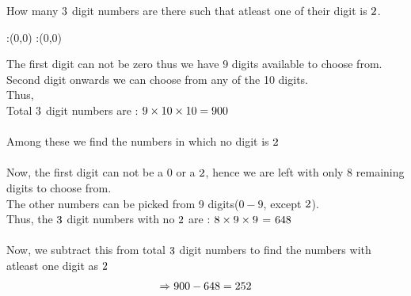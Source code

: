 



\question[3] How many $3$ digit numbers are there such that atleast one of their digit is $2$. 


\watchout

\ifprintanswers
  \begin{marginfigure}
      :(0,0)
      :(0,0)
    \figdrawbegin{}
      \figdrawline [100,101]
    \figdrawend
    \figvisu{\figBoxA}{}{%
    }
    \centerline{\box\figBoxA}
  \end{marginfigure}
\fi 

\begin{solution}[\halfpage]
The first digit can not be zero thus we have 9 digits available to choose from. Second digit onwards we can choose from any of the 10 digits.\\
Thus,\\
Total ${3}$ digit numbers are : ${9 \times 10 \times 10} = {900}$\\ \\
Among these we find the numbers in which no digit is $2$\\ \\
Now, the first digit can not be a $0$ or a $2$, hence we are left with only 8 remaining digits to choose from. \\
The other numbers can be picked from 9 digits($0 - 9$, except ${2}$).\\
Thus, the $3$ digit numbers with no  $2$ are : ${8 \times 9 \times 9}$ = ${648}$\\
\\
Now, we subtract this from total $3$ digit numbers to find the numbers with atleast one digit as ${2}$
\begin{align}
\Rightarrow 900 - 648 = 252
\end{align}
\end{solution}

 

